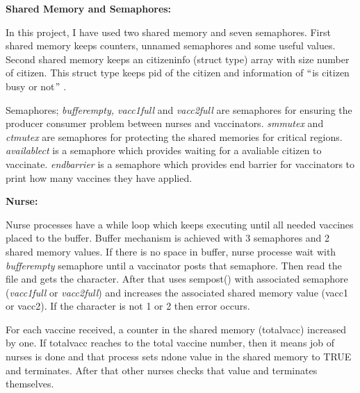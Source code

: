 \documentclass[12pt]{report}
\renewcommand{\_}{\kern-1.5pt\textunderscore\kern-1.5pt}
\begin{document}
\vspace{\baselineskip}
\begin{FlushLeft}
{\fontsize{14pt}{16.8pt}\selectfont \textbf{Shared Memory and Semaphores:}} 
\end{FlushLeft}
\begin{FlushLeft}
In this project, I have used two shared memory and seven semaphores. First shared memory keeps counters, unnamed semaphores and some useful values. Second shared memory keeps an citizen\_info (struct type) array with size number of citizen. This struct type keeps pid of the citizen and information of $``$is citizen busy or not$"$ .
\end{FlushLeft}
\begin{FlushLeft}
Semaphores; \textit{buffer\_empty, vacc1\_full} and \textit{vacc2\_full }are semaphores for ensuring the producer consumer problem between nurses and vaccinators. \textit{sm\_mutex} and \textit{ct\_mutex }are semaphores for protecting the shared memories for critical regions. \textit{available\_ct} is a semaphore which provides waiting for a avaliable citizen to vaccinate. \textit{end\_barrier} is a semaphore which provides end barrier for vaccinators to print how many vaccines they have applied.
\end{FlushLeft}

\vspace{\baselineskip}
\begin{FlushLeft}
{\fontsize{14pt}{16.8pt}\selectfont \textbf{Nurse:}} 
\end{FlushLeft}
\begin{FlushLeft}
Nurse processes have a while loop which keeps executing until all needed vaccines placed to the buffer. Buffer mechanism is achieved with 3 semaphores and 2 shared memory values. If there is no space in buffer, nurse processe wait with \textit{buffer\_empty }semaphore until a vaccinator posts that semaphore. Then read the file and gets the character. After that uses sem\_post() with associated semaphore (\textit{vacc1\_full} or \textit{vacc2\_full}) and increases the associated shared memory value (vacc\_1 or vacc\_2). If the character is not 1 or 2 then error occurs.
\end{FlushLeft}
\begin{FlushLeft}
For each vaccine received, a counter in the shared memory (total\_vacc) increased by one. If total\_vacc reaches to the total vaccine number, then it means job of nurses is done and that process sets n\_done value in the shared memory to TRUE and terminates. After that other nurses checks that value and terminates themselves.
\end{FlushLeft}
\end{document}
